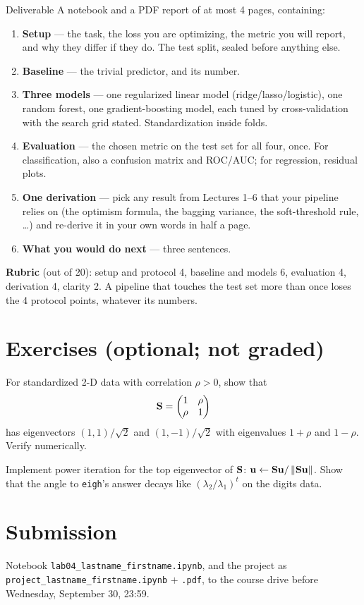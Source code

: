 \documentclass[11pt]{article}
\begin{document}
\begin{task}{Deliverable}
A notebook and a PDF report of at most 4 pages, containing:
\begin{enumerate}[nosep]
  \item \textbf{Setup} --- the task, the loss you are optimizing, the metric you will report, and why they differ if they do.
        The test split, sealed before anything else.
  \item \textbf{Baseline} --- the trivial predictor, and its number.
  \item \textbf{Three models} --- one regularized linear model (ridge/lasso/logistic), one random forest, one
        gradient-boosting model, each tuned by cross-validation with the search grid stated. Standardization inside folds.
  \item \textbf{Evaluation} --- the chosen metric on the test set for all four, once. For classification, also a
        confusion matrix and ROC/AUC; for regression, residual plots.
  \item \textbf{One derivation} --- pick any result from Lectures 1--6 that your pipeline relies on (the optimism
        formula, the bagging variance, the soft-threshold rule, \dots) and re-derive it in your own words in half a page.
  \item \textbf{What you would do next} --- three sentences.
\end{enumerate}
\end{task}

\textbf{Rubric} (out of 20): setup and protocol 4, baseline and models 6, evaluation 4, derivation 4, clarity 2.
A pipeline that touches the test set more than once loses the 4 protocol points, whatever its numbers.

\section{Exercises (optional; not graded)}
\begin{exercise}
For standardized 2-D data with correlation $\rho>0$, show that
\[\mathbf{S}=\begin{pmatrix}1&\rho\\\rho&1\end{pmatrix}\]
has eigenvectors $(1,1)/\sqrt2$ and $(1,-1)/\sqrt2$ with eigenvalues $1+\rho$ and $1-\rho$. Verify numerically.
\end{exercise}
\begin{exercise}
Implement power iteration for the top eigenvector of $\mathbf{S}$: $\mathbf{u}\leftarrow\mathbf{S}\mathbf{u}/\left\lVert \mathbf{S}\mathbf{u} \right\rVert$. Show that
the angle to \texttt{eigh}'s answer decays like $(\lambda_2/\lambda_1)^t$ on the digits data.
\end{exercise}

\section*{Submission}
Notebook \texttt{lab04\_lastname\_firstname.ipynb}, and the project as\\ \texttt{project\_lastname\_firstname.ipynb} $+$ \texttt{.pdf}, to the course drive before Wednesday, September 30, 23:59.
\end{document}
